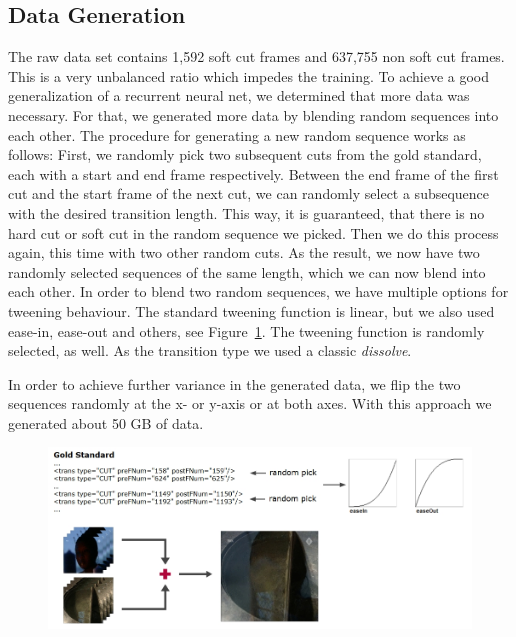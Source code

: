 \subsection{Data Generation}
\label{sec:soft_cut_data_generation}

The raw data set contains 1,592 soft cut frames and 637,755 non soft cut frames.
This is a very unbalanced ratio which impedes the training.
To achieve a good generalization of a recurrent neural net, we determined that more data was necessary.
For that, we generated more data by blending random sequences into each other.
The procedure for generating a new random sequence works as follows:
First, we randomly pick two subsequent cuts from the gold standard, each with a start and end frame respectively.
Between the end frame of the first cut and the start frame of the next cut, we can randomly select a subsequence with the desired transition length.
This way, it is guaranteed, that there is no hard cut or soft cut in the random sequence we picked.
Then we do this process again, this time with two other random cuts.
As the result, we now have two randomly selected sequences of the same length, which we can now blend into each other.
In order to blend two random sequences, we have multiple options for tweening behaviour.
The standard tweening function is linear, but we also used ease-in, ease-out and others, see Figure~\ref{fig:data_generation}.
The tweening function is randomly selected, as well.
As the transition type we used a classic \textit{dissolve}.

In order to achieve further variance in the generated data, we flip the two sequences randomly at the x- or y-axis or at both axes.
With this approach we generated about 50 GB of data.

\begin{figure}
    \centering
    \includegraphics[scale=.5]{images/data_generation.jpg}
    \caption{}
    \label{fig:data_generation}
\end{figure}

